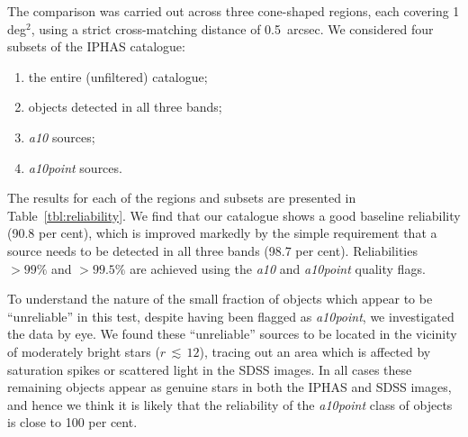 \documentclass[a4paper,useAMS,usenatbib]{mn2e}
\begin{document}
{%

The comparison was carried out across three cone-shaped regions,
each covering 1 deg$^2$,
using a strict cross-matching distance of 0.5~arcsec.
We considered four subsets of the IPHAS catalogue:
\begin{enumerate}
\item the entire (unfiltered) catalogue;
\item objects detected in all three bands;
\item \emph{a10} sources;
\item \emph{a10point} sources.
\end{enumerate}

The results for each of the regions and subsets
are presented in Table~\ref{tbl:reliability}.
We find that our catalogue shows a good
baseline reliability (90.8 per cent),
which is improved markedly by the simple requirement
that a source needs to be detected in all three bands
(98.7 per cent). 
Reliabilities $>99\%$ and $>99.5\%$ are achieved using the 
\emph{a10} and \emph{a10point} quality flags.

To understand the nature of the small fraction of objects
which appear to be ``unreliable'' in this test,
despite having been flagged as \emph{a10point},
we investigated the data by eye.
We found these ``unreliable'' sources to be located
in the vicinity of moderately bright stars ($r\,\lesssim\,12$),
tracing out an area which is affected by saturation spikes or
scattered light in the SDSS images.
In all cases these remaining objects appear as genuine
stars in both the IPHAS and SDSS images,
and hence we think it is likely that the reliability
of the \emph{a10point} class of objects is close to 100 per cent.

}
\end{document}
